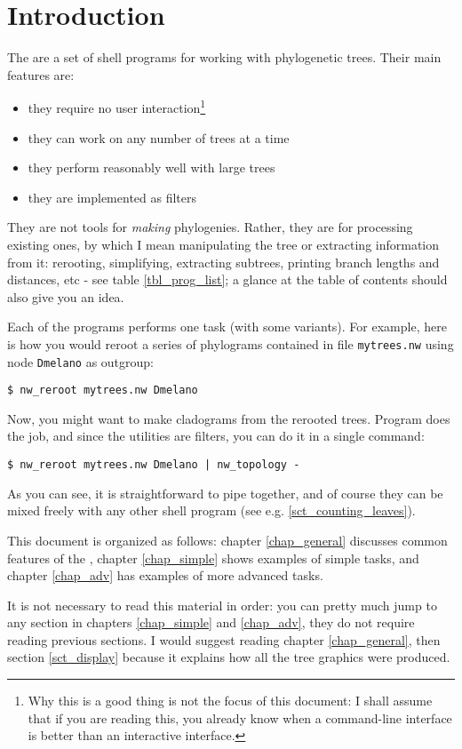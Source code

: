 
\chapter*{Introduction}

The \nutils{} are a set of \unix{} shell programs for working with phylogenetic trees. Their main features are:
\begin{itemize}
 \item they require no user interaction\footnote{Why this is a good thing is not the focus of this document: I shall assume that if you are reading this, you already know when a command-line interface is better than an interactive interface.}
 \item they can work on any number of trees at a time
 \item they perform reasonably well with large trees
 \item they are implemented as filters
\end{itemize}
They are not tools for \emph{making} phylogenies. Rather, they are for
processing existing ones, by which I mean manipulating the tree or extracting
information from it: rerooting, simplifying, extracting subtrees, printing
branch lengths and distances, etc - see table \ref{tbl_prog_list}; a glance
at the table of contents should also give you an idea.

Each of the programs performs one task (with some variants). For example, here
is how you would reroot a series of phylograms contained in file
\texttt{mytrees.nw} using node \texttt{Dmelano} as outgroup:

\begin{verbatim}
$ nw_reroot mytrees.nw Dmelano
\end{verbatim} 
Now, you might want to make cladograms from the rerooted trees. Program \topology{} does the job, and since the utilities are filters, you can do it in a single command:
\begin{verbatim}
$ nw_reroot mytrees.nw Dmelano | nw_topology -
\end{verbatim}
As you can see, it is straightforward to pipe \nutils{} together, and of course they can be mixed freely with any other shell program (see e.g. \ref{sct_counting_leaves}).

This document is organized as follows: chapter \ref{chap_general} discusses
common features of the \nutils, chapter \ref{chap_simple} shows examples of
simple tasks, and chapter \ref{chap_adv} has examples of more advanced tasks. 

It is not necessary to read this material in order: you can pretty much jump to
any section in chapters \ref{chap_simple} and \ref{chap_adv}, they do not
require reading previous sections. I would suggest reading chapter
\ref{chap_general}, then section \ref{sct_display} because it explains how all
the tree graphics were produced.

